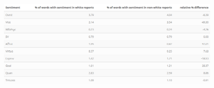 \documentclass[oneside,12pt]{Classes/RoboticsLaTeX}
\begin{document}
\begin{figure}[!htb]
  \centering
  \begin{minipage}{1\textwidth}
    \centering
    \includegraphics[width=1\linewidth]{Figures/enquirer.png}
    \label{fig:GI_tag_comp}
  \end{minipage}%
\end{figure}
\end{document}
